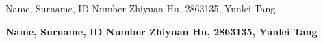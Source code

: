 \documentclass
[twoside,english,colorbacktitle,accentcolor=tud9c]
{tudexercise}
\newcommand{\studentdata}{Zhiyuan Hu, 2863135, Yunlei Tang}
\begin{document}
	
	\hwtitle{}
	\maketitle

	\begin{examheader} 
		\normalsize
		\vspace{-1em}
		Name, Surname, ID Number \hfill \studentdata{}
		\vspace{-1em}
	\end{examheader} 
	
	\textbf{Name, Surname, ID Number \hfill \studentdata{}}

	
	
	
	
	
\end{document}
